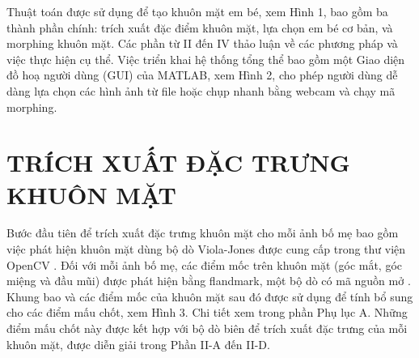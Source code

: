 \documentclass[journal]{IEEEtran}
\begin{document}
Thuật toán được sử dụng để tạo khuôn mặt em bé, xem Hình 1, bao gồm ba thành phần chính: trích xuất đặc điểm khuôn mặt, lựa chọn em bé cơ bản, và morphing khuôn mặt. Các phần từ II đến IV thảo luận về các phương pháp và việc thực hiện cụ thể. Việc triển khai hệ thống tổng thể bao gồm một Giao diện đồ hoạ người dùng (GUI) của MATLAB, xem Hình 2, cho phép người dùng dễ dàng lựa chọn các hình ảnh từ file hoặc chụp nhanh bằng webcam và chạy mã morphing.

\section{TRÍCH XUẤT ĐẶC TRƯNG KHUÔN MẶT}
Bước đầu tiên để trích xuất đặc trưng khuôn mặt cho mỗi ảnh bố mẹ bao gồm việc phát hiện khuôn mặt dùng bộ dò Viola-Jones được cung cấp trong thư viện OpenCV \cite{ref:r2}. Đối với mỗi ảnh bố mẹ, các điểm mốc trên khuôn mặt (góc mắt, góc miệng và đầu mũi) được phát hiện bằng flandmark, một bộ dò có mã nguồn mở \cite{ref:r3}. Khung bao và các điểm mốc của khuôn mặt sau đó được sử dụng để tính bổ sung cho các điểm mấu chốt, xem Hình 3. Chi tiết xem trong phần Phụ lục A. Những điểm mấu chốt này được kết hợp với bộ dò biên để trích xuất đặc trưng của mỗi khuôn mặt, được diễn giải trong Phần II-A đến II-D.
\end{document}

